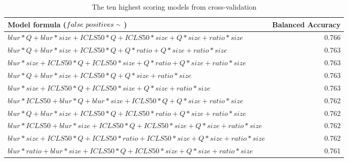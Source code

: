 \documentclass[12pt]{article}
\newcommand{\mytilde}{\raise.17ex\hbox{$\scriptstyle\mathtt{\sim}$}} %
\begin{document}
\begin{table}[ht]
	\caption{The ten highest scoring models from cross-validation}
	\tiny
	\begin{center}
	\begin{tabular}{lr}
		\toprule
		Model formula ($false \ positives \ \mytilde \ $) & Balanced Accuracy \\ 
		\midrule
		$blur*Q+blur*size+ICLS50*Q+ICLS50*size+Q*size+ratio*size$ & 0.766 \\
		$blur*Q+blur*size+ICLS50*Q+Q*ratio+Q*size+ratio*size$ & 0.763 \\
		$blur*size+ICLS50*Q+ICLS50*size+Q*ratio+Q*size+ratio*size$ & 0.763 \\
		$blur*Q+blur*size+ICLS50*Q+Q*size+ratio*size$ & 0.763 \\
		$blur*size+ICLS50*Q+ICLS50*size+Q*size+ratio*size$ & 0.763 \\
		$blur*ICLS50+blur*Q+blur*size+ICLS50*Q+Q*size+ratio*size$ & 0.762 \\
		$blur*Q+blur*size+ICLS50*Q+ICLS50*ratio+Q*size+ratio*size$ & 0.762 \\
		$blur*ICLS50+blur*size+ICLS50*Q+ICLS50*size+Q*size+ratio*size$ & 0.762 \\
		$blur*size+ICLS50*Q+ICLS50*ratio+ICLS50*size+Q*size+ratio*size$ & 0.762 \\
		$blur*ratio+blur*size+ICLS50*Q+ICLS50*size+Q*size+ratio*size$ & 0.761 \\  
		\bottomrule
	\end{tabular}
	\end{center}
	\label{tab:CVtop10}
\end{table}
\end{document}
